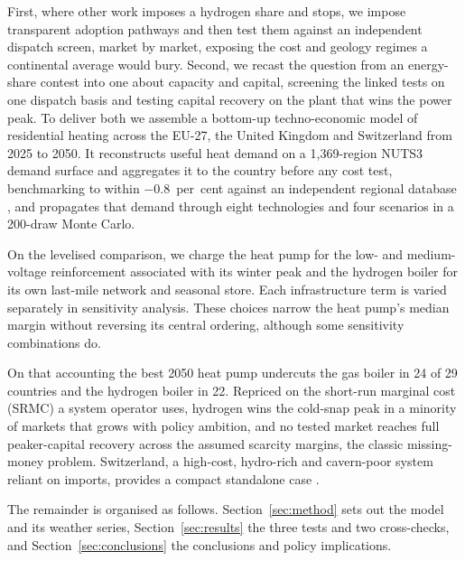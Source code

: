 First, where other work imposes a hydrogen share and stops, we impose transparent adoption pathways and then test them against an independent dispatch screen, market by market, exposing the cost and geology regimes a continental average would bury. Second, we recast the question from an energy-share contest into one about capacity and capital, screening the linked tests on one dispatch basis and testing capital recovery on the plant that wins the power peak. To deliver both we assemble a bottom-up techno-economic model of residential heating across the EU-27, the United Kingdom and Switzerland from 2025 to 2050. It reconstructs useful heat demand on a 1{,}369-region NUTS3 demand surface and aggregates it to the country before any cost test, benchmarking to within $-0.8$~per~cent against an independent regional database \citep{MilojevicDupont2023Eubucco,Loga2016Tabula}, and propagates that demand through eight technologies and four scenarios in a 200-draw Monte Carlo.

On the levelised comparison, we charge the heat pump for the low- and medium-voltage reinforcement associated with its winter peak and the hydrogen boiler for its own last-mile network and seasonal store. Each infrastructure term is varied separately in sensitivity analysis. These choices narrow the heat pump's median margin without reversing its central ordering, although some sensitivity combinations do.

On that accounting the best 2050 heat pump undercuts the gas boiler in 24 of 29 countries
and the hydrogen boiler in 22. Repriced on the short-run marginal cost (SRMC) a system
operator uses, hydrogen wins the cold-snap peak in a minority of markets that grows with
policy ambition, and no tested market reaches full peaker-capital recovery across the assumed scarcity margins, the classic missing-money problem. Switzerland, a high-cost, hydro-rich and cavern-poor system reliant on imports,
provides a compact standalone case \citep{Gabrielli2020,IEA2023switzerland}.

The remainder is organised as follows. Section~\ref{sec:method} sets out the model and its
weather series, Section~\ref{sec:results} the three tests and two cross-checks, and
Section~\ref{sec:conclusions} the conclusions and policy implications.
